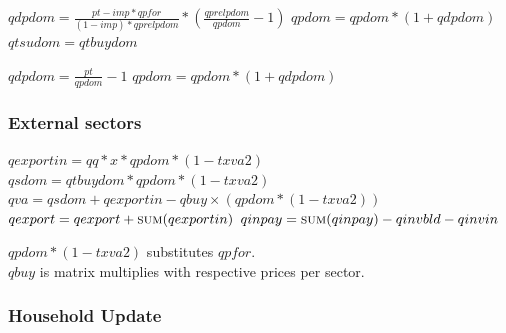 \documentclass{article}
\begin{document}
\begin{algorithm}[!htbp]
\caption{Domestic Results (Market)}
    \begin{algorithmic}
        \State $qdpdom = \frac{pt - imp * qpfor}{(1 - imp) * qprelpdom} * (\frac{qprelpdom}{qpdom} - 1)$
        \State $qpdom = qpdom * (1 + qdpdom)$
        \State $qtsudom = qtbuydom$
        \EndFunction
    \end{algorithmic}
\end{algorithm}

\begin{algorithm}[!htbp]
\caption{Domestic Results (External)}
    \begin{algorithmic}
        \State $qdpdom = \frac{pt}{qpdom} - 1$
        \State $qpdom = qpdom * (1 + qdpdom)$
        \EndFunction
    \end{algorithmic}
\end{algorithm}

\subsubsection{External sectors}

\begin{algorithm}[H]
\caption{External Sectors}
    \begin{algorithmic}
        \State $qexportin = qq * x * qpdom * (1 - txva2)$
        \State $qsdom = qtbuydom * qpdom * (1 - txva2)$
        \State $qva = qsdom + qexportin - qbuy \times (qpdom * (1 - txva2))$
        \EndFor
        \\
        \State $qexport = qexport + \Call{sum}{qexportin}$
        \State $qinpay = \Call{sum}{qinpay} - qinvbld - qinvin$
        \EndFunction
    \end{algorithmic}
    \small $qpdom * (1 - txva2)$ substitutes $qpfor$.\\
    \small $qbuy$ is matrix multiplies with respective prices per sector.
\end{algorithm}

\subsubsection{Household Update}
\end{document}
